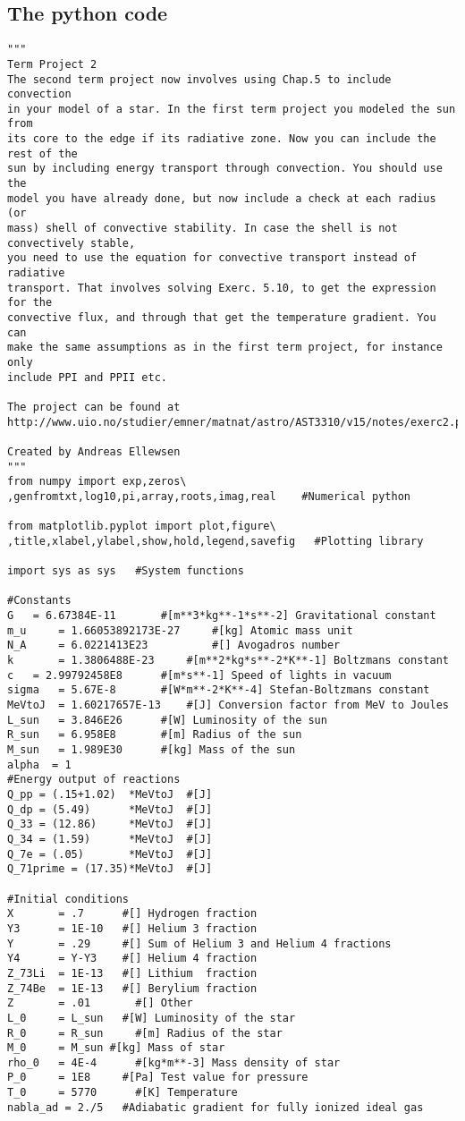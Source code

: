 \documentclass[a4paper,12pt]{article}
\begin{document}
\subsection{The python code}
\begin{verbatim}
"""
Term Project 2
The second term project now involves using Chap.5 to include convection
in your model of a star. In the first term project you modeled the sun from
its core to the edge if its radiative zone. Now you can include the rest of the
sun by including energy transport through convection. You should use the
model you have already done, but now include a check at each radius (or
mass) shell of convective stability. In case the shell is not convectively stable,
you need to use the equation for convective transport instead of radiative
transport. That involves solving Exerc. 5.10, to get the expression for the
convective flux, and through that get the temperature gradient. You can
make the same assumptions as in the first term project, for instance only
include PPI and PPII etc.

The project can be found at 
http://www.uio.no/studier/emner/matnat/astro/AST3310/v15/notes/exerc2.pdf

Created by Andreas Ellewsen
"""
from numpy import exp,zeros\
,genfromtxt,log10,pi,array,roots,imag,real    #Numerical python

from matplotlib.pyplot import plot,figure\
,title,xlabel,ylabel,show,hold,legend,savefig	#Plotting library

import sys as sys	#System functions

#Constants
G	= 6.67384E-11		#[m**3*kg**-1*s**-2] Gravitational constant
m_u 	= 1.66053892173E-27 	#[kg] Atomic mass unit
N_A 	= 6.0221413E23      	#[] Avogadros number
k   	= 1.3806488E-23		#[m**2*kg*s**-2*K**-1] Boltzmans constant
c	= 2.99792458E8		#[m*s**-1] Speed of lights in vacuum
sigma   = 5.67E-8		#[W*m**-2*K**-4] Stefan-Boltzmans constant
MeVtoJ 	= 1.60217657E-13 	#[J] Conversion factor from MeV to Joules
L_sun  	= 3.846E26		#[W] Luminosity of the sun
R_sun  	= 6.958E8		#[m] Radius of the sun
M_sun  	= 1.989E30		#[kg] Mass of the sun
alpha  = 1
#Energy output of reactions
Q_pp = (.15+1.02)  *MeVtoJ	#[J]
Q_dp = (5.49)	   *MeVtoJ	#[J]
Q_33 = (12.86)	   *MeVtoJ	#[J]
Q_34 = (1.59)	   *MeVtoJ	#[J]
Q_7e = (.05)	   *MeVtoJ	#[J]
Q_71prime = (17.35)*MeVtoJ	#[J]

#Initial conditions
X       = .7      #[] Hydrogen fraction
Y3      = 1E-10   #[] Helium 3 fraction
Y       = .29     #[] Sum of Helium 3 and Helium 4 fractions
Y4      = Y-Y3    #[] Helium 4 fraction
Z_73Li  = 1E-13   #[] Lithium  fraction
Z_74Be  = 1E-13   #[] Berylium fraction
Z       = .01		#[] Other
L_0     = L_sun   #[W] Luminosity of the star
R_0     = R_sun   	#[m] Radius of the star
M_0     = M_sun	#[kg] Mass of star 
rho_0   = 4E-4		#[kg*m**-3] Mass density of star 
P_0     = 1E8     #[Pa] Test value for pressure
T_0     = 5770	  	#[K] Temperature
nabla_ad = 2./5   #Adiabatic gradient for fully ionized ideal gas


\end{verbatim}
\end{document}
